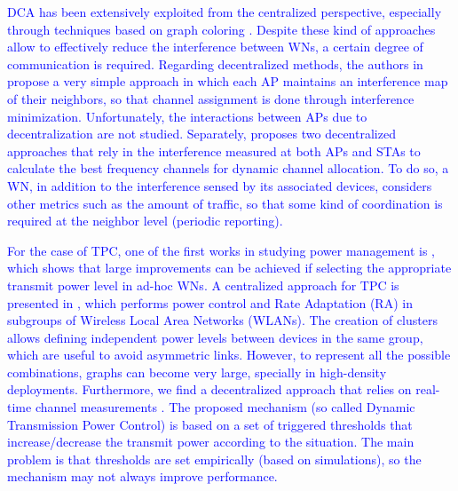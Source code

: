 \documentclass[10pt,journal,compsoc]{IEEEtran}
\newcommand{\francesc}[1]{\textcolor{blue}{#1}}
\begin{document}
	\francesc{DCA has been extensively exploited from the centralized perspective, especially through techniques based on graph coloring \cite{riihijarvi2005frequency, mishra2005weighted}. Despite these kind of approaches allow to effectively reduce the interference between WNs, a certain degree of communication is required. Regarding decentralized methods, the authors in \cite{akl2007dynamic} propose a very simple approach in which each AP maintains an interference map of their neighbors, so that channel assignment is done through interference minimization. Unfortunately, the interactions between APs due to decentralization are not studied. Separately, \cite{chen2007improved} proposes two decentralized approaches 
	that rely in the interference measured at both APs and STAs to calculate the best frequency channels for dynamic channel allocation. To do so, a WN, in addition to the interference sensed by its associated devices, considers other metrics such as the amount of traffic, so that some kind of coordination is required at the neighbor level (periodic reporting).} %
	
	\francesc{For the case of TPC, one of the first works in studying power management is \cite{elbatt2000power}, which shows that large improvements can be achieved if selecting the appropriate transmit power level in ad-hoc WNs. A centralized approach for TPC is presented in \cite{tang2014joint}, which performs power control and Rate Adaptation (RA) in subgroups of Wireless Local Area Networks (WLANs). The creation of clusters allows defining independent power levels between devices in the same group, which are useful to avoid asymmetric links. However, to represent all the possible combinations, graphs can become very large, specially in high-density deployments. Furthermore, we find a decentralized approach that relies on real-time channel measurements \cite{gandarillas2014dynamic}. The proposed mechanism (so called Dynamic Transmission Power Control) is based on a set of triggered thresholds that increase/decrease the transmit power according to the situation. The main problem is that thresholds are set empirically (based on simulations), so the mechanism may not always improve performance.}  	
	
	
\end{document}
